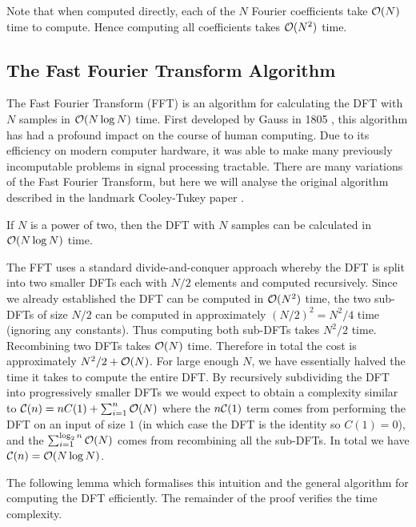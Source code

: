 Note that when computed directly, each of the $N$ Fourier coefficients take $\mathcal O(N)$ time to compute. Hence computing all coefficients takes $\mathcal O(N^2)$ time.


\subsection{The Fast Fourier Transform Algorithm}

The Fast Fourier Transform (FFT) is an algorithm for calculating the DFT with $N$ samples in $\mathcal O(N \log N)$ time. First developed by Gauss in 1805 \cite{gauss}, this algorithm has had a profound impact on the course of human computing. Due to its efficiency on modern computer hardware, it was able to make many previously incomputable problems in signal processing tractable.
There are many variations of the Fast Fourier Transform, but here we will analyse the original algorithm described in the landmark Cooley-Tukey paper \cite{fft}.

\begin{theorem}\label{thm:fft}
    If $N$ is a power of two, then the DFT with $N$ samples can be calculated in $\mathcal O(N\log N)$ time.
\end{theorem}

The FFT uses a standard divide-and-conquer approach whereby the DFT is split into two smaller DFTs each with $N/2$ elements and computed recursively. Since we already established the DFT can be computed in $\mathcal O(N^2)$ time, the two sub-DFTs of size $N/2$ can be computed in approximately $(N/2)^2 = N^2/4$ time (ignoring any constants). Thus computing both sub-DFTs takes $N^2 / 2$ time.\\
Recombining two DFTs takes $\mathcal O(N)$ time. Therefore in total the cost is approximately $N^2/2 + \mathcal O(N)$. For large enough $N$, we have essentially halved the time it takes to compute the entire DFT. By recursively subdividing the DFT into progressively smaller DFTs we would expect to obtain a complexity similar to $\mathcal C(n) = nC(1) + \sum^n_{i=1} \mathcal O(N)$ where the $n\mathcal C(1)$ term comes from performing the DFT on an input of size $1$ (in which case the DFT is the identity so $C(1) = 0$), and the $\sum^{\log_2 n}_{i=1} \mathcal O(N)$ comes from recombining all the sub-DFTs. In total we have $\mathcal C(n) = \mathcal O(N \log N)$.

The following lemma which formalises this intuition and the general algorithm for computing the DFT efficiently. The remainder of the proof verifies the time complexity.


